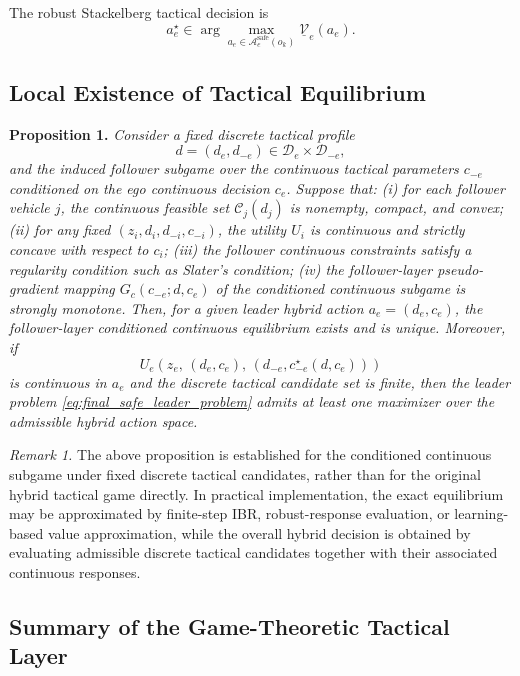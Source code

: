 \documentclass[final ,3p, times]{elsarticle}
\begin{document}
The robust Stackelberg tactical decision is
\begin{equation}
a_e^\star
\in
\arg\max_{a_e\in\mathcal{A}_e^{\mathrm{safe}}(o_k)}
\underline{\mathcal{V}}_e(a_e).
\label{eq:robust_stackelberg_policy}
\end{equation}



\subsection{Local Existence of Tactical Equilibrium}
\label{subsec:equilibrium_existence}

\textbf{Proposition 1.}
\emph{
Consider a fixed discrete tactical profile
\[
d = (d_e,d_{-e}) \in \mathcal{D}_e \times \mathcal{D}_{-e},
\]
and the induced follower subgame over the continuous tactical parameters $c_{-e}$ conditioned on the ego continuous decision $c_e$. Suppose that:
(i) for each follower vehicle $j$, the continuous feasible set $\mathcal{C}_j(d_j)$ is nonempty, compact, and convex;
(ii) for any fixed $(z_i,d_i,d_{-i},c_{-i})$, the utility $U_i$ is continuous and strictly concave with respect to $c_i$;
(iii) the follower continuous constraints satisfy a regularity condition such as Slater's condition;
(iv) the follower-layer pseudo-gradient mapping $G_c(c_{-e};d,c_e)$ of the conditioned continuous subgame is strongly monotone.
Then, for a given leader hybrid action $a_e=(d_e,c_e)$, the follower-layer conditioned continuous equilibrium exists and is unique. Moreover, if
\[
U_e\!\left(
z_e,\,
(d_e,c_e),\,
(d_{-e},c_{-e}^{\star}(d,c_e))
\right)
\]
is continuous in $a_e$ and the discrete tactical candidate set is finite, then the leader problem \eqref{eq:final_safe_leader_problem} admits at least one maximizer over the admissible hybrid action space.
}

\textit{Remark 1.}
The above proposition is established for the conditioned continuous subgame under fixed discrete tactical candidates, rather than for the original hybrid tactical game directly. In practical implementation, the exact equilibrium may be approximated by finite-step IBR, robust-response evaluation, or learning-based value approximation, while the overall hybrid decision is obtained by evaluating admissible discrete tactical candidates together with their associated continuous responses.



\subsection{Summary of the Game-Theoretic Tactical Layer}
\label{subsec:tactical_summary}
\end{document}
